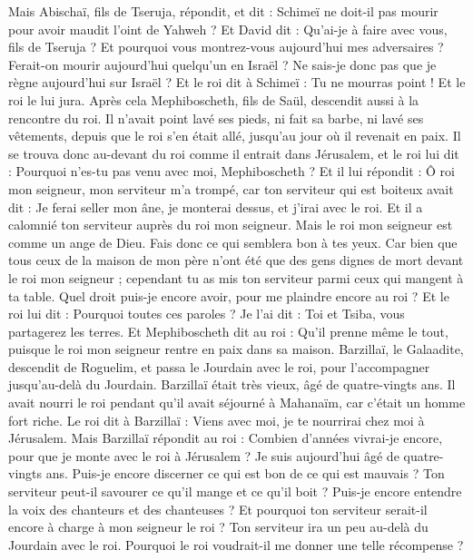 \begin{multicols}{2}
Mais Abischaï, fils de Tseruja, répondit, et dit : Schimeï ne doit-il pas mourir pour avoir maudit l'oint de Yahweh ?
Et David dit : Qu'ai-je à faire avec vous, fils de Tseruja ? Et pourquoi vous montrez-vous aujourd'hui mes adversaires ? Ferait-on mourir aujourd'hui quelqu'un en Israël ? Ne sais-je donc pas que je règne aujourd'hui sur Israël ?
Et le roi dit à Schimeï : Tu ne mourras point ! Et le roi le lui jura.
Après cela Mephiboscheth, fils de Saül, descendit aussi à la rencontre du roi. Il n'avait point lavé ses pieds, ni fait sa barbe, ni lavé ses vêtements, depuis que le roi s'en était allé, jusqu'au jour où il revenait en paix.
Il se trouva donc au-devant du roi comme il entrait dans Jérusalem, et le roi lui dit : Pourquoi n'es-tu pas venu avec moi, Mephiboscheth ?
Et il lui répondit : Ô roi mon seigneur, mon serviteur m'a trompé, car ton serviteur qui est boiteux avait dit : Je ferai seller mon âne, je monterai dessus, et j'irai avec le roi.
Et il a calomnié ton serviteur auprès du roi mon seigneur. Mais le roi mon seigneur est comme un ange de Dieu. Fais donc ce qui semblera bon à tes yeux.
Car bien que tous ceux de la maison de mon père n’ont été que des gens dignes de mort devant le roi mon seigneur ; cependant tu as mis ton serviteur parmi ceux qui mangent à ta table. Quel droit puis-je encore avoir, pour me plaindre encore au roi ?
Et le roi lui dit : Pourquoi toutes ces paroles ? Je l'ai dit : Toi et Tsiba, vous partagerez les terres.
Et Mephiboscheth dit au roi : Qu'il prenne même le tout, puisque le roi mon seigneur rentre en paix dans sa maison.
Barzillaï, le Galaadite, descendit de Roguelim, et passa le Jourdain avec le roi, pour l'accompagner jusqu'au-delà du Jourdain.
Barzillaï était très vieux, âgé de quatre-vingts ans. Il avait nourri le roi pendant qu'il avait séjourné à Mahanaïm, car c'était un homme fort riche.
Le roi dit à Barzillaï : Viens avec moi, je te nourrirai chez moi à Jérusalem.
Mais Barzillaï répondit au roi : Combien d'années vivrai-je encore, pour que je monte avec le roi à Jérusalem ?
Je suis aujourd'hui âgé de quatre-vingts ans. Puis-je encore discerner ce qui est bon de ce qui est mauvais ? Ton serviteur peut-il savourer ce qu'il mange et ce qu'il boit ? Puis-je encore entendre la voix des chanteurs et des chanteuses ? Et pourquoi ton serviteur serait-il encore à charge à mon seigneur le roi ?
Ton serviteur ira un peu au-delà du Jourdain avec le roi. Pourquoi le roi voudrait-il me donner une telle récompense ?

\end{multicols}
